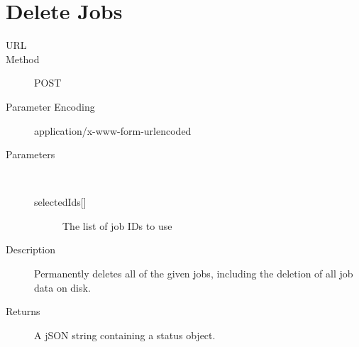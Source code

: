\section{Delete Jobs}
\begin{description}
\item [URL] 
\item [Method] POST
\item [Parameter Encoding] application/x-www-form-urlencoded
\item [Parameters] \
	\begin{description}
	\item [{selectedIds[]}]  The list of job IDs to use
	\end{description}
\item [Description] Permanently deletes all of the given jobs, including the deletion of all job data on disk.
\item [Returns] A jSON string containing a status object.
\end{description}
